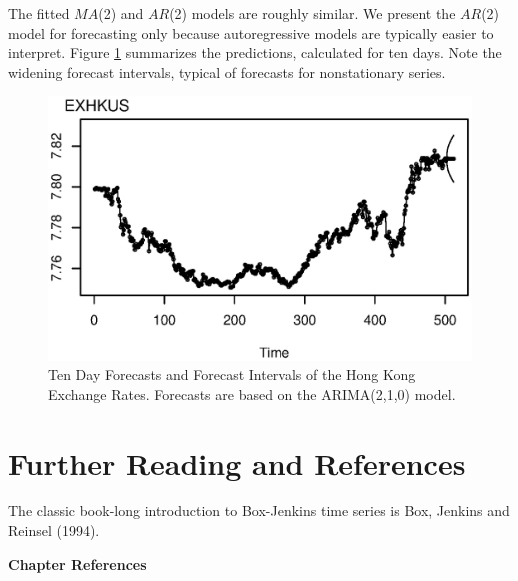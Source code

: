 The fitted $MA$(2) and $AR$(2) models are roughly similar. We
present the $AR$(2) model for forecasting only because
autoregressive models are typically easier to interpret. Figure
\ref{F8:HKForecast} summarizes the predictions, calculated for ten
days. Note the widening forecast intervals, typical of forecasts for
nonstationary series.
\begin{figure}[htp]
  \begin{center}
    \includegraphics[width=.8\textwidth]{Chapter8AutoReg/F88ARI21Fore.eps}
    \caption{\label{F8:HKForecast} \small Ten Day Forecasts and Forecast Intervals of the Hong Kong Exchange Rates.
    Forecasts are based on the ARIMA(2,1,0) model.}
  \end{center}
\end{figure}

\linejed
\bigskip



\section{Further Reading and References}

The classic book-long introduction to Box-Jenkins time series is
Box, Jenkins and Reinsel (1994).

\bigskip


\textbf{Chapter References}

